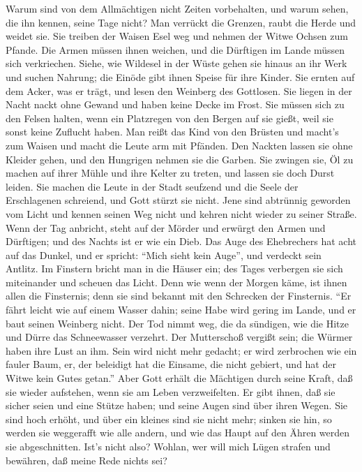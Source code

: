  Warum sind von dem Allmächtigen nicht Zeiten vorbehalten,
und warum sehen, die ihn kennen, seine Tage nicht?  Man
verrückt die Grenzen, raubt die Herde und weidet sie.  Sie
treiben der Waisen Esel weg und nehmen der Witwe Ochsen zum Pfande.
 Die Armen müssen ihnen weichen, und die Dürftigen im Lande
müssen sich verkriechen.  Siehe, wie Wildesel in der Wüste
gehen sie hinaus an ihr Werk und suchen Nahrung; die Einöde gibt ihnen
Speise für ihre Kinder.  Sie ernten auf dem Acker, was er
trägt, und lesen den Weinberg des Gottlosen.  Sie liegen in
der Nacht nackt ohne Gewand und haben keine Decke im Frost. 
Sie müssen sich zu den Felsen halten, wenn ein Platzregen von den Bergen
auf sie gießt, weil sie sonst keine Zuflucht haben.  Man
reißt das Kind von den Brüsten und macht's zum Waisen und macht die
Leute arm mit Pfänden.  Den Nackten lassen sie ohne Kleider
gehen, und den Hungrigen nehmen sie die Garben.  Sie
zwingen sie, Öl zu machen auf ihrer Mühle und ihre Kelter zu treten, und
lassen sie doch Durst leiden.  Sie machen die Leute in der
Stadt seufzend und die Seele der Erschlagenen schreiend, und Gott stürzt
sie nicht.  Jene sind abtrünnig geworden vom Licht und
kennen seinen Weg nicht und kehren nicht wieder zu seiner Straße.
 Wenn der Tag anbricht, steht auf der Mörder und erwürgt
den Armen und Dürftigen; und des Nachts ist er wie ein Dieb.
 Das Auge des Ehebrechers hat acht auf das Dunkel, und er
spricht: ``Mich sieht kein Auge'', und verdeckt sein Antlitz.
 Im Finstern bricht man in die Häuser ein; des Tages
verbergen sie sich miteinander und scheuen das Licht.  Denn
wie wenn der Morgen käme, ist ihnen allen die Finsternis; denn sie sind
bekannt mit den Schrecken der Finsternis.  ``Er fährt
leicht wie auf einem Wasser dahin; seine Habe wird gering im Lande, und
er baut seinen Weinberg nicht.  Der Tod nimmt weg, die da
sündigen, wie die Hitze und Dürre das Schneewasser verzehrt.
 Der Mutterschoß vergißt sein; die Würmer haben ihre Lust
an ihm. Sein wird nicht mehr gedacht; er wird zerbrochen wie ein fauler
Baum,  er, der beleidigt hat die Einsame, die nicht
gebiert, und hat der Witwe kein Gutes getan.''  Aber Gott
erhält die Mächtigen durch seine Kraft, daß sie wieder aufstehen, wenn
sie am Leben verzweifelten.  Er gibt ihnen, daß sie sicher
seien und eine Stütze haben; und seine Augen sind über ihren Wegen.
 Sie sind hoch erhöht, und über ein kleines sind sie nicht
mehr; sinken sie hin, so werden sie weggerafft wie alle andern, und wie
das Haupt auf den Ähren werden sie abgeschnitten.  Ist's
nicht also? Wohlan, wer will mich Lügen strafen und bewähren, daß meine
Rede nichts sei?

